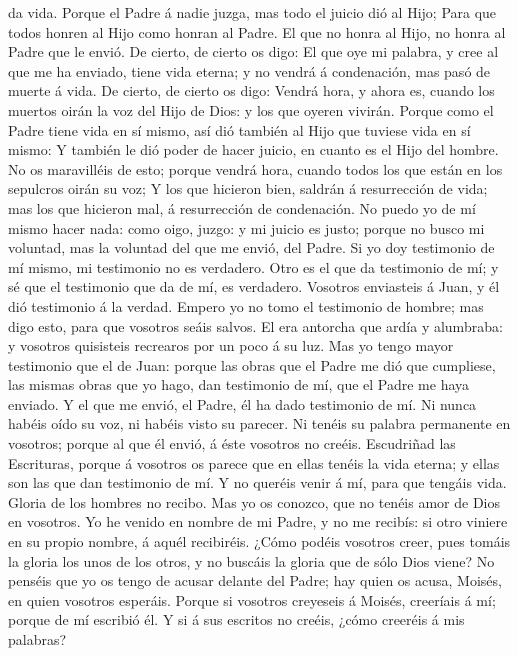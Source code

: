 da vida.  Porque el Padre á nadie juzga, mas todo el juicio
dió al Hijo;  Para que todos honren al Hijo como honran al
Padre. El que no honra al Hijo, no honra al Padre que le envió.
 De cierto, de cierto os digo: El que oye mi palabra, y
cree al que me ha enviado, tiene vida eterna; y no vendrá á condenación,
mas pasó de muerte á vida.  De cierto, de cierto os digo:
Vendrá hora, y ahora es, cuando los muertos oirán la voz del Hijo de
Dios: y los que oyeren vivirán.  Porque como el Padre tiene
vida en sí mismo, así dió también al Hijo que tuviese vida en sí mismo:
 Y también le dió poder de hacer juicio, en cuanto es el
Hijo del hombre.  No os maravilléis de esto; porque vendrá
hora, cuando todos los que están en los sepulcros oirán su voz;
 Y los que hicieron bien, saldrán á resurrección de vida;
mas los que hicieron mal, á resurrección de condenación. 
No puedo yo de mí mismo hacer nada: como oigo, juzgo: y mi juicio es
justo; porque no busco mi voluntad, mas la voluntad del que me envió,
del Padre.  Si yo doy testimonio de mí mismo, mi testimonio
no es verdadero.  Otro es el que da testimonio de mí; y sé
que el testimonio que da de mí, es verdadero.  Vosotros
enviasteis á Juan, y él dió testimonio á la verdad.  Empero
yo no tomo el testimonio de hombre; mas digo esto, para que vosotros
seáis salvos.  El era antorcha que ardía y alumbraba: y
vosotros quisisteis recrearos por un poco á su luz.  Mas yo
tengo mayor testimonio que el de Juan: porque las obras que el Padre me
dió que cumpliese, las mismas obras que yo hago, dan testimonio de mí,
que el Padre me haya enviado.  Y el que me envió, el Padre,
él ha dado testimonio de mí. Ni nunca habéis oído su voz, ni habéis
visto su parecer.  Ni tenéis su palabra permanente en
vosotros; porque al que él envió, á éste vosotros no creéis.
 Escudriñad las Escrituras, porque á vosotros os parece que
en ellas tenéis la vida eterna; y ellas son las que dan testimonio de
mí.  Y no queréis venir á mí, para que tengáis vida.
 Gloria de los hombres no recibo.  Mas yo os
conozco, que no tenéis amor de Dios en vosotros.  Yo he
venido en nombre de mi Padre, y no me recibís: si otro viniere en su
propio nombre, á aquél recibiréis.  ¿Cómo podéis vosotros
creer, pues tomáis la gloria los unos de los otros, y no buscáis la
gloria que de sólo Dios viene?  No penséis que yo os tengo
de acusar delante del Padre; hay quien os acusa, Moisés, en quien
vosotros esperáis.  Porque si vosotros creyeseis á Moisés,
creeríais á mí; porque de mí escribió él.  Y si á sus
escritos no creéis, ¿cómo creeréis á mis palabras?

